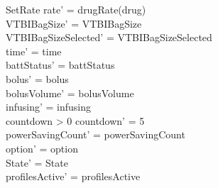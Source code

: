 \begin{schema}{SetRate}
	rate' = drugRate(drug)\\
	VTBIBagSize' = VTBIBagSize\\ 
	VTBIBagSizeSelected' = VTBIBagSizeSelected\\
	time' = time\\
	battStatus' = battStatus\\
	bolus' = bolus\\
	bolusVolume' = bolusVolume\\
	infusing' = infusing\\
	countdown > 0 \land countdown' = 5\\
	powerSavingCount' = powerSavingCount\\ 
	option' = option\\
State' = State\\
	profilesActive' = profilesActive
\end{schema}

